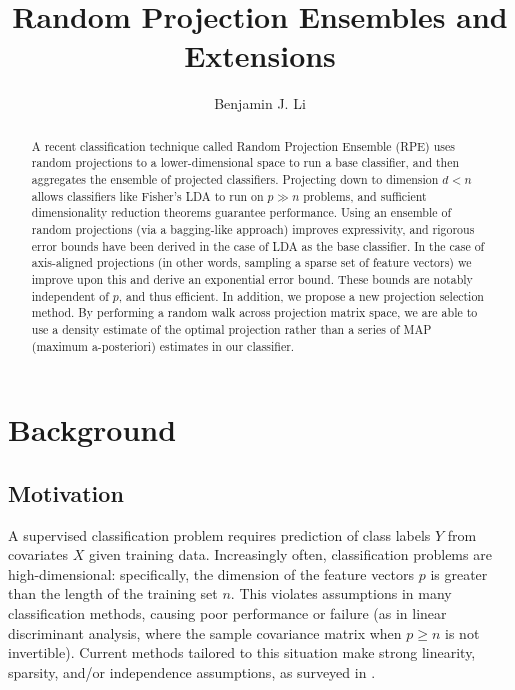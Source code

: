 \documentclass{amsart}
\begin{document}
\title{Random Projection Ensembles and Extensions}

\author{Benjamin J. Li}

\begin{abstract}
	A recent classification technique called Random Projection Ensemble (RPE) uses random projections to a lower-dimensional space to run a base classifier, and then aggregates the ensemble of projected classifiers. Projecting down to dimension $d<n$ allows classifiers like Fisher's LDA to run on $p\gg n$ problems, and sufficient dimensionality reduction theorems guarantee performance. Using an ensemble of random projections (via a bagging-like approach) improves expressivity, and rigorous error bounds have been derived in the case of LDA as the base classifier.
	In the case of axis-aligned projections (in other words, sampling a sparse set of feature vectors) we improve upon this and derive an exponential error bound. These bounds are notably independent of $p$, and thus efficient. In addition, we propose a new projection selection method. By performing a random walk across projection matrix space, we are able to use a density estimate of the optimal projection rather than a series of MAP (maximum a-posteriori) estimates in our classifier.
\end{abstract}

\maketitle








\section{Background}

\subsection{Motivation}

A supervised classification problem requires prediction of class labels $Y$ from covariates $X$ given training data. Increasingly often, classification problems are high-dimensional: specifically, the dimension of the feature vectors $p$ is greater than the length of the training set $n$. This violates assumptions in many classification methods, causing poor performance or failure (as in linear discriminant analysis, where the sample covariance matrix when $p\geq n$ is not invertible). Current methods tailored to this situation make strong linearity, sparsity, and/or independence assumptions, as surveyed in \cite{CS15}.
\end{document}
